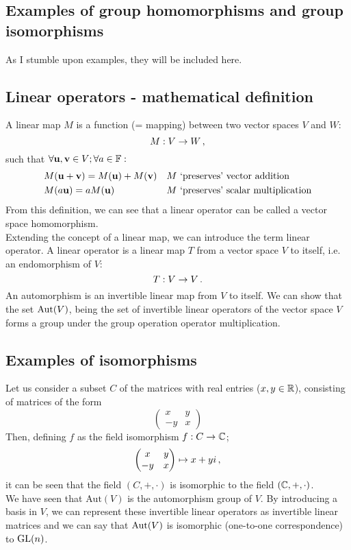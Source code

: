     \subsection{Examples of group homomorphisms and group isomorphisms}
        As I stumble upon examples, they will be included here.

    \subsection{Linear operators - mathematical definition}
        A linear map $M$ is a function (= mapping) between two vector spaces $V$ and $W$:
        \begin{equation}
            M: V \rightarrow W \thinspace ,
        \end{equation}
        such that $\forall \vb{u}, \vb{v} \in V; \forall a \in \mathbb{F}:$
        \begin{align}
            &M(\vb{u} + \vb{v}) = M(\vb{u}) + M(\vb{v})     && \text{$M$ `preserves' vector addition} \\
            &M(a \vb{u}) = a M(\vb{u})                      && \text{$M$ `preserves' scalar multiplication}
        \end{align}
        From this definition, we can see that a linear operator can be called a vector space homomorphism. \\

        Extending the concept of a linear map, we can introduce the term linear operator. A linear operator is a linear map $T$ from a vector space $V$ to itself, i.e. an endomorphism of $V$:
        \begin{equation}
            T: V \rightarrow V \thinspace .
        \end{equation}
        An automorphism is an invertible linear map from $V$ to itself. We can show that the set $\operatorname{Aut}(V)$, being the set of invertible linear operators of the vector space $V$ forms a group under the group operation operator multiplication.

    \subsection{Examples of isomorphisms}
        Let us consider a subset $C$ of the matrices with real entries ($x, y \in \mathbb{R}$), consisting of matrices of the form
        \begin{equation}
            \begin{pmatrix} x & y \\ -y & x \end{pmatrix}
        \end{equation}
        Then, defining $f$ as the field isomorphism $f: C \rightarrow \mathbb{C}$;
        \begin{equation}
            \begin{pmatrix} x & y \\ -y & x \end{pmatrix} \mapsto x + yi \thinspace ,
        \end{equation}
        it can be seen that the field $(C, +, \cdot)$ is isomorphic to the field $(\mathbb{C}, +, \cdot)$. \\

        We have seen that $\text{Aut}(V)$ is the automorphism group of $V$. By introducing a basis in $V$, we can represent these invertible linear operators as invertible linear matrices and we can say that $\operatorname{Aut}(V)$ is isomorphic (one-to-one correspondence) to $\operatorname{GL}(n)$. \\
